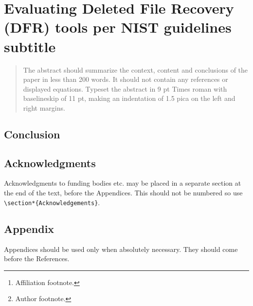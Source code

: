 \documentclass{ws-rv9x6}
\begin{document}
\chapter[Evaluating Deleted File Recovery (DFR) tools per NIST guidelines]{Evaluating Deleted File Recovery (DFR) tools per NIST guidelines\\ subtitle\label{ra_ch1}}

\author[F. Author and S. Author]{First Author and Second Author\footnote{Author footnote.}}

\address{CS Department, BGSU,\\
Bowling Green, Ohio, USA 43403, \\
f\_author@bgsu.edu\footnote{Affiliation footnote.}}
 
\begin{abstract}
The abstract should summarize the context, content and conclusions of
the paper in less than 200 words. It should not contain any references
or displayed equations. Typeset the abstract in 9 pt Times roman with
baselineskip of 11 pt, making an indentation of 1.5 pica on the left
and right margins.
\end{abstract}


\body








\section{Conclusion}\label{conclusion}

\section{Acknowledgments}
Acknowledgments to funding bodies etc. may be placed in a separate
section at the end of the text, before the Appendices. This should not
be numbered so use \verb|\section*{Acknowledgements}|.

\section{Appendix}
Appendices should be used only when absolutely necessary. They
should come before the References.





\end{document}

